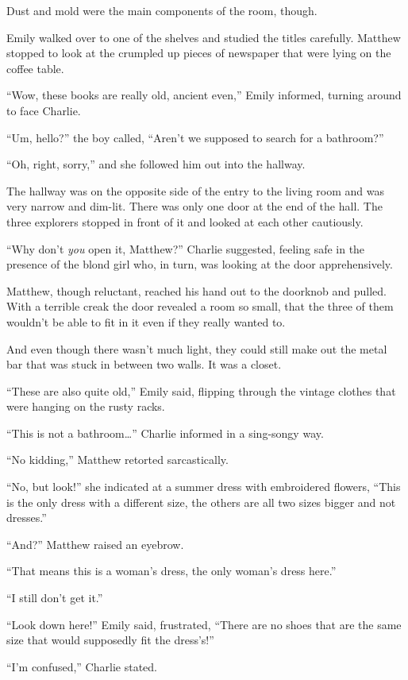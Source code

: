 Dust and mold were the main components of the room, though.

Emily walked over to one of the shelves and studied the titles carefully. Matthew stopped to look at the crumpled up pieces of newspaper that were lying on the coffee table.

“Wow, these books are really old, ancient even,” Emily informed, turning around to face Charlie.

“Um, hello?” the boy called, “Aren’t we supposed to search for a bathroom?”

“Oh, right, sorry,” and she followed him out into the hallway.

The hallway was on the opposite side of the entry to the living room and was very narrow and dim-lit. There was only one door at the end of the hall. The three explorers stopped in front of it and looked at each other cautiously.

“Why don’t \textit{you} open it, Matthew?” Charlie suggested, feeling safe in the presence of the blond girl who, in turn, was looking at the door apprehensively.

Matthew, though reluctant, reached his hand out to the doorknob and pulled. With a terrible creak the door revealed a room so small, that the three of them wouldn’t be able to fit in it even if they really wanted to.

And even though there wasn’t much light, they could still make out the metal bar that was stuck in between two walls. It was a closet.

“These are also quite old,” Emily said, flipping through the vintage clothes that were hanging on the rusty racks.

“This is not a bathroom…” Charlie informed in a sing-songy way.

“No kidding,” Matthew retorted sarcastically.

“No, but look!” she indicated at a summer dress with embroidered flowers, “This is the only dress with a different size, the others are all two sizes bigger and not dresses.”

“And?” Matthew raised an eyebrow.

“That means this is a woman’s dress, the only woman’s dress here.”

“I still don’t get it.”

“Look down here!” Emily said, frustrated, “There are no shoes that are the same size that would supposedly fit the dress’s!”

“I’m confused,” Charlie stated.

